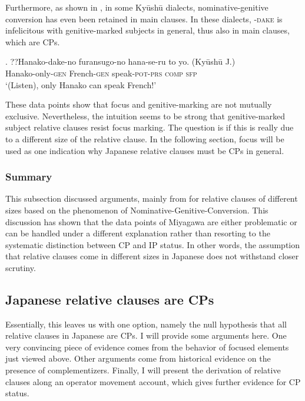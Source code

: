 \documentclass [output=book,colorlinks,citecolor=brown]{langscibook}
\begin{document}
Furthermore, as shown in \citet{ochi:2017:ga}, in some Kyūshū dialects, nominative-genitive conversion has even been retained in main clauses. In these dialects, -\textsc{dake} is infelicitous with genitive-marked subjects in general, thus also in main clauses, which are CPs. %


\exg. ??Hanako-dake-no furansugo-no hana-se-ru to yo. (Kyūshū J.)\\
Hanako-only-\textsc{gen} French-\textsc{gen} speak-\textsc{pot-prs} \textsc{comp} \textsc{sfp}\\
`(Listen), only Hanako can speak French!’ \\ \null \hfill \citep[692]{ochi:2017:ga}

These data points show that focus and genitive-marking are not mutually exclusive. Nevertheless, the intuition seems to be strong that genitive-marked subject relative clauses resist focus marking. The question is if this is really due to a different size of the relative clause. In the following section, focus will be used as one indication why Japanese relative clauses must be CPs in general.

\subsubsection{Summary}

This subsection discussed arguments, mainly from \citet{miyagawa:2011:genitive, miyagawa:2012:case, miyagawa:2017:agreement} for relative clauses of different sizes based on the phenomenon of Nominative-Genitive-Conversion. This discussion has shown that the data points of Miyagawa are either problematic or can be handled under a different explanation rather than resorting to the systematic distinction between CP and IP status. In other words, the assumption that relative clauses come in different sizes in Japanese does not withstand closer scrutiny.

\subsection{Japanese relative clauses are CPs} \label{kaplan}

Essentially, this leaves us with one option, namely the null hypothesis that all relative clauses in Japanese are CPs. I will provide some arguments here. One very convincing piece of evidence comes from the behavior of focused elements just viewed above. Other arguments come from historical evidence on the presence of complementizers. Finally, I will present the derivation of relative clauses along an operator movement account, which gives further evidence for CP status.
\end{document}
